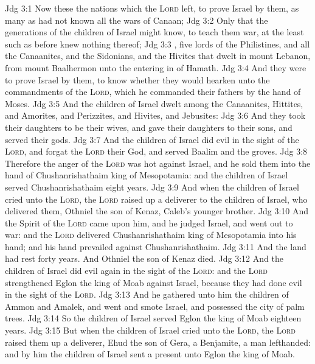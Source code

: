 \vs Jdg 3:1 Now these  the nations which the \textsc{Lord} left, to prove Israel by them,  as many  as had not known all the wars of Canaan;
\vs Jdg 3:2 Only that the generations of the children of Israel might know, to teach them war, at the least such as before knew nothing thereof;
\vs Jdg 3:3 , five lords of the Philistines, and all the Canaanites, and the Sidonians, and the Hivites that dwelt in mount Lebanon, from mount Baalhermon unto the entering in of Hamath.
\vs Jdg 3:4 And they were to prove Israel by them, to know whether they would hearken unto the commandments of the \textsc{Lord}, which he commanded their fathers by the hand of Moses.
\vs Jdg 3:5 And the children of Israel dwelt among the Canaanites, Hittites, and Amorites, and Perizzites, and Hivites, and Jebusites:
\vs Jdg 3:6 And they took their daughters to be their wives, and gave their daughters to their sons, and served their gods.
\vs Jdg 3:7 And the children of Israel did evil in the sight of the \textsc{Lord}, and forgat the \textsc{Lord} their God, and served Baalim and the groves.
\vs Jdg 3:8 Therefore the anger of the \textsc{Lord} was hot against Israel, and he sold them into the hand of Chushanrishathaim king of Mesopotamia: and the children of Israel served Chushanrishathaim eight years.
\vs Jdg 3:9 And when the children of Israel cried unto the \textsc{Lord}, the \textsc{Lord} raised up a deliverer to the children of Israel, who delivered them,  Othniel the son of Kenaz, Caleb's younger brother.
\vs Jdg 3:10 And the Spirit of the \textsc{Lord} came upon him, and he judged Israel, and went out to war: and the \textsc{Lord} delivered Chushanrishathaim king of Mesopotamia into his hand; and his hand prevailed against Chushanrishathaim.
\vs Jdg 3:11 And the land had rest forty years. And Othniel the son of Kenaz died.
\vs Jdg 3:12 And the children of Israel did evil again in the sight of the \textsc{Lord}: and the \textsc{Lord} strengthened Eglon the king of Moab against Israel, because they had done evil in the sight of the \textsc{Lord}.
\vs Jdg 3:13 And he gathered unto him the children of Ammon and Amalek, and went and smote Israel, and possessed the city of palm trees.
\vs Jdg 3:14 So the children of Israel served Eglon the king of Moab eighteen years.
\vs Jdg 3:15 But when the children of Israel cried unto the \textsc{Lord}, the \textsc{Lord} raised them up a deliverer, Ehud the son of Gera, a Benjamite, a man lefthanded: and by him the children of Israel sent a present unto Eglon the king of Moab.
